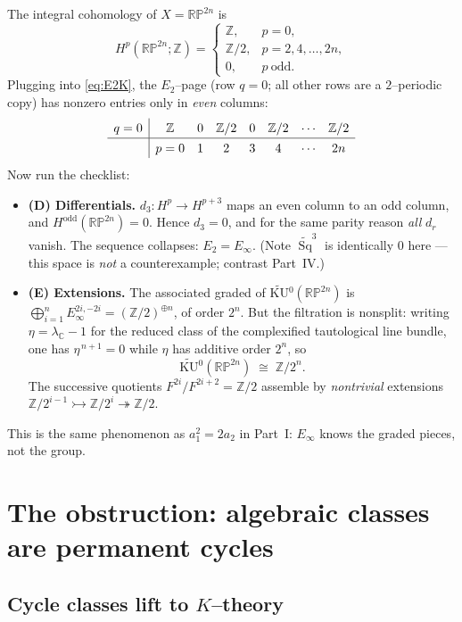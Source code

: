 \documentclass{article}
\newcommand{\C}{{\mathbb{C}}}
\newcommand{\Z}{{\mathbb{Z}}}
\DeclareMathOperator{\Sq}{Sq}
\newcommand{\RP}{\mathbb{RP}}
\newcommand{\KU}{\mathrm{KU}}
\begin{document}
The integral cohomology of $X=\RP^{2n}$ is
\[
  H^{p}(\RP^{2n};\Z)=
  \begin{cases}\Z,& p=0,\\ \Z/2,& p=2,4,\dots,2n,\\ 0,& p\ \text{odd}.\end{cases}
\]
Plugging into \eqref{eq:E2K}, the $E_2$--page (row $q=0$; all other rows are a
$2$--periodic copy) has nonzero entries only in \emph{even} columns:
\[
\renewcommand{\arraystretch}{1.3}
\begin{array}{c|ccccccc}
 q=0 & \Z & 0 & \Z/2 & 0 & \Z/2 & \cdots & \Z/2\\ \hline
     & p=0 & 1 & 2 & 3 & 4 & \cdots & 2n
\end{array}
\]
Now run the checklist:
\begin{itemize}
\item \textbf{(D) Differentials.} $d_3\colon H^p\to H^{p+3}$ maps an even column
to an odd column, and $H^{\mathrm{odd}}(\RP^{2n})=0$. Hence $d_3=0$, and for the
same parity reason \emph{all} $d_r$ vanish. The sequence collapses:
$E_2=E_\infty$. (Note $\widetilde{\Sq}^3$ is identically $0$ here --- this space
is \emph{not} a counterexample; contrast Part~IV.)
\item \textbf{(E) Extensions.} The associated graded of
$\widetilde{\KU}{}^0(\RP^{2n})$ is $\bigoplus_{i=1}^{n}E_\infty^{2i,-2i}
=(\Z/2)^{\oplus n}$, of order $2^n$. But the filtration is nonsplit: writing
$\eta=\lambda_\C-1$ for the reduced class of the complexified tautological line
bundle, one has $\eta^{\,n+1}=0$ while $\eta$ has additive order $2^n$, so
\[
  \widetilde{\KU}{}^0(\RP^{2n})\;\cong\;\Z/2^n .
\]
The successive quotients $F^{2i}/F^{2i+2}=\Z/2$ assemble by \emph{nontrivial}
extensions $\Z/2^{i-1}\rightarrowtail \Z/2^{i}\twoheadrightarrow \Z/2$.
\end{itemize}
This is the same phenomenon as $a_1^2=2a_2$ in Part~I: $E_\infty$ knows the
graded pieces, not the group.

\section{The obstruction: algebraic classes are permanent cycles}

\subsection{Cycle classes lift to $K$--theory}
\end{document}
